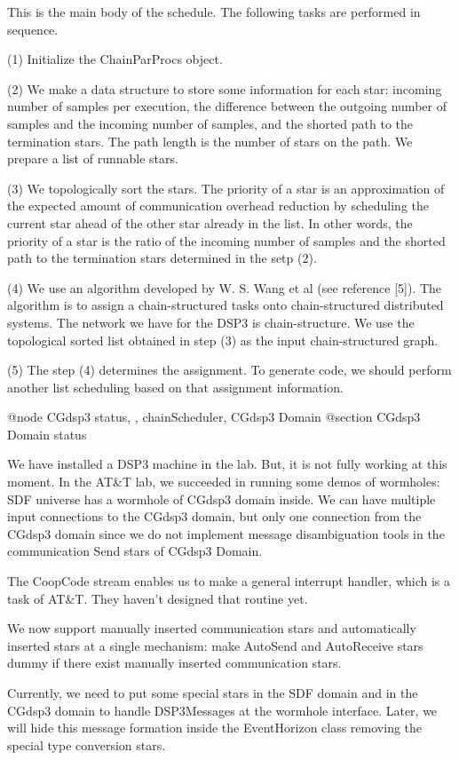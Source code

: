 {This is the main body of the schedule.
The following tasks are performed in sequence.

(1) Initialize the ChainParProcs object.

(2) We make a data structure to store some information for each star: incoming
number of samples per execution, the difference between the outgoing
number of samples and the incoming number of samples, and the shorted path
to the termination stars. The path length is the number of stars on the path.
We prepare a list of runnable stars.

(3) We topologically sort the stars. The priority of a star is an
approximation of the expected
amount of communication overhead reduction by scheduling the current star
ahead of the other star already in the list. In other words, the priority of
a star is the ratio of the incoming number of samples and the shorted path
to the termination stars determined in the setp (2).

(4) We use an algorithm developed by W. S. Wang et al (see reference [5]).
The algorithm is to assign a chain-structured tasks onto chain-structured
distributed systems. The network we have for the DSP3 is chain-structure.
We use the topological sorted list obtained in step (3) as the input
chain-structured graph.

(5) The step (4) determines the assignment. To generate code, we should
perform another list scheduling based on that assignment information.

@node CGdsp3 status, , chainScheduler, CGdsp3 Domain
@section CGdsp3 Domain status

We have installed a DSP3 machine in the lab. But, it is not fully working
at this moment. In the AT&T lab, we succeeded in running some demos of
wormholes: SDF universe has a wormhole of CGdsp3 domain inside.
We can have multiple input connections to the CGdsp3 domain, but only
one connection from the CGdsp3 domain since we do not implement
message disambiguation tools in the communication Send stars of CGdsp3 Domain.

The CoopCode stream enables us to make a general interrupt handler, which is
a task of AT&T. They haven't designed that routine yet.

We now support manually inserted communication stars and 
automatically inserted stars at a single mechanism: make AutoSend and 
AutoReceive stars dummy if there exist manually inserted communication stars.

Currently, we need to put some special stars in the SDF domain and in the
CGdsp3 domain to handle DSP3Messages at the wormhole interface. Later,
we will hide this message formation inside the EventHorizon class removing
the special type conversion stars.

}
